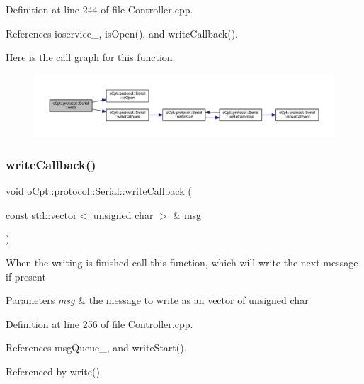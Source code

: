 Definition at line 244 of file Controller.\+cpp.



References ioservice\+\_\+, is\+Open(), and write\+Callback().

Here is the call graph for this function\+:\nopagebreak
\begin{figure}[H]
\begin{center}
\leavevmode
\includegraphics[width=350pt]{classo_cpt_1_1protocol_1_1_serial_ae99cac9dc20997ca09742df8d1bc6091_cgraph}
\end{center}
\end{figure}
\hypertarget{classo_cpt_1_1protocol_1_1_serial_a02f091d3e3333bc1f723216cbeb757af}{}\label{classo_cpt_1_1protocol_1_1_serial_a02f091d3e3333bc1f723216cbeb757af} 
\subsubsection{\texorpdfstring{write\+Callback()}{writeCallback()}}
{\footnotesize\ttfamily void o\+Cpt\+::protocol\+::\+Serial\+::write\+Callback (\begin{DoxyParamCaption}\item[{const std\+::vector$<$ unsigned char $>$ \&}]{msg }\end{DoxyParamCaption})\hspace{0.3cm}{\ttfamily [protected]}}

When the writing is finished call this function, which will write the next message if present 
\begin{DoxyParams}{Parameters}
{\em msg} & the message to write as an vector of unsigned char \\
\hline
\end{DoxyParams}


Definition at line 256 of file Controller.\+cpp.



References msg\+Queue\+\_\+, and write\+Start().



Referenced by write().

